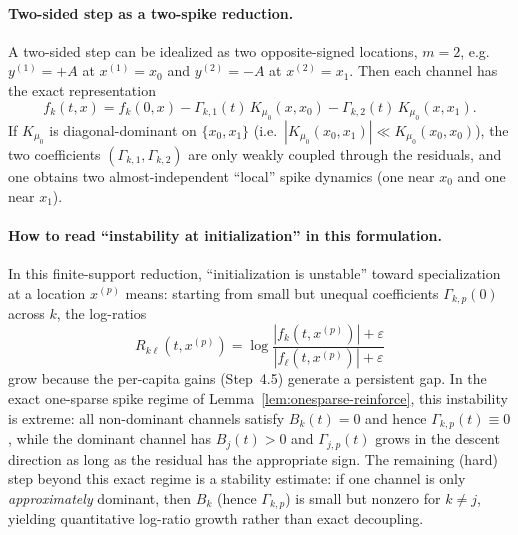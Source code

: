 \paragraph{Two-sided step as a two-spike reduction.}
A two-sided step can be idealized as two opposite-signed locations, $m=2$, e.g.\ $y^{(1)}=+A$ at $x^{(1)}=x_0$ and $y^{(2)}=-A$ at $x^{(2)}=x_1$.
Then each channel has the exact representation
\[
f_k(t,x)=f_k(0,x)-\Gamma_{k,1}(t)\,K_{\mu_0}(x,x_0)-\Gamma_{k,2}(t)\,K_{\mu_0}(x,x_1).
\]
If $K_{\mu_0}$ is diagonal-dominant on $\{x_0,x_1\}$ (i.e.\ $|K_{\mu_0}(x_0,x_1)|\ll K_{\mu_0}(x_0,x_0)$), the two coefficients $(\Gamma_{k,1},\Gamma_{k,2})$ are only weakly coupled through the residuals, and one obtains two almost-independent ``local'' spike dynamics (one near $x_0$ and one near $x_1$).

\paragraph{How to read ``instability at initialization'' in this formulation.}
In this finite-support reduction, ``initialization is unstable'' toward specialization at a location $x^{(p)}$ means:
starting from small but unequal coefficients $\Gamma_{k,p}(0)$ across $k$, the log-ratios
\[
R_{k\ell}(t,x^{(p)})=\log\frac{|f_k(t,x^{(p)})|+\varepsilon}{|f_\ell(t,x^{(p)})|+\varepsilon}
\]
grow because the per-capita gains (Step~4.5) generate a persistent gap.
In the exact one-sparse spike regime of Lemma~\ref{lem:onesparse-reinforce}, this instability is extreme: all non-dominant channels satisfy $B_k(t)=0$ and hence $\Gamma_{k,p}(t)\equiv 0$, while the dominant channel has $B_j(t)>0$ and $\Gamma_{j,p}(t)$ grows in the descent direction as long as the residual has the appropriate sign.
The remaining (hard) step beyond this exact regime is a stability estimate: if one channel is only \emph{approximately} dominant, then $B_k$ (hence $\Gamma_{k,p}$) is small but nonzero for $k\neq j$, yielding quantitative log-ratio growth rather than exact decoupling.

